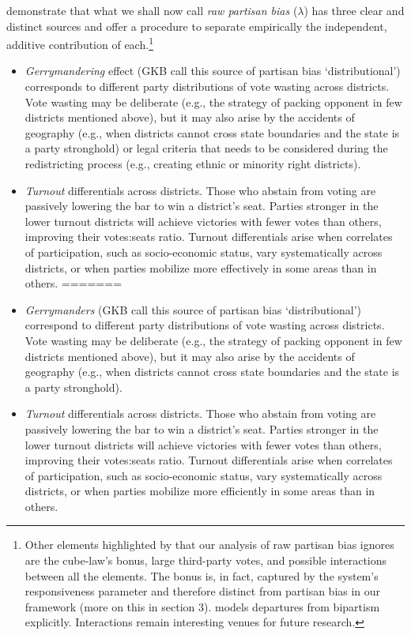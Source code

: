 \documentclass[letter,12pt]{article}
\begin{document}
\citet[][, henceforth GKB]{grofman.etalBiasMalapp.1997} demonstrate that what we shall now call \emph{raw partisan bias} ($\lambda$) has three clear and distinct sources and offer a procedure to separate empirically the independent, additive contribution of each.\footnote{Other elements highlighted by \citet{gudgin.taylor.1980decomposeBias} that our analysis of raw partisan bias ignores are the cube-law's bonus, large third-party votes, and possible interactions between all the elements. The bonus is, in fact, captured by the system's responsiveness parameter and therefore distinct from partisan bias in our framework (more on this in section 3). \citet{calvo.2009roadToPR} models departures from bipartism explicitly. Interactions remain interesting venues for future research.} 

\begin{itemize}
<<<<<<< HEAD
\item \emph{Gerrymandering} effect (GKB call this source of partisan bias `distributional') corresponds to different party distributions of vote wasting across districts. Vote wasting may be deliberate (e.g., the strategy of packing opponent in few districts mentioned above), but it may also arise by the accidents of geography (e.g., when districts cannot cross state boundaries and the state is a party stronghold) or legal criteria that needs to be considered during the redistricting process (e.g., creating ethnic or minority right districts).
\item \emph{Turnout} differentials across districts. Those who abstain from voting are passively lowering the bar to win a district's seat. Parties stronger in the lower turnout districts will achieve victories with fewer votes than others, improving their votes:seats ratio. Turnout differentials arise when correlates of participation, such as socio-economic status, vary systematically across districts, or when parties mobilize more effectively in some areas than in others. 
=======
\item \emph{Gerrymanders} (GKB call this source of partisan bias `distributional') correspond to different party distributions of vote wasting across districts. Vote wasting may be deliberate (e.g., the strategy of packing opponent in few districts mentioned above), but it may also arise by the accidents of geography (e.g., when districts cannot cross state boundaries and the state is a party stronghold).
\item \emph{Turnout} differentials across districts. Those who abstain from voting are passively lowering the bar to win a district's seat. Parties stronger in the lower turnout districts will achieve victories with fewer votes than others, improving their votes:seats ratio. Turnout differentials arise when correlates of participation, such as socio-economic status, vary systematically across districts, or when parties mobilize more efficiently in some areas than in others. 

\end{itemize}
\end{document}
